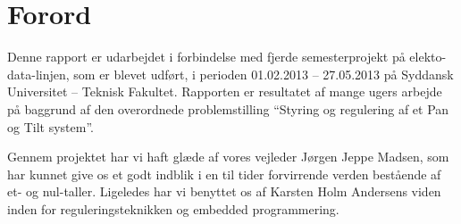 \documentclass[rapport.tex]{subfiles}
\begin{document}
\section*{Forord}

Denne rapport er udarbejdet i forbindelse med fjerde semesterprojekt på elekto-data-linjen, som er blevet udført, i perioden 01.02.2013 – 27.05.2013 på Syddansk Universitet – Teknisk Fakultet. Rapporten er resultatet af mange ugers arbejde på baggrund af den overordnede problemstilling ``Styring og regulering af et Pan og Tilt system''.

Gennem projektet har vi haft glæde af vores vejleder Jørgen Jeppe Madsen, som har kunnet give os et godt indblik i en til tider forvirrende verden bestående af et- og nul-taller. Ligeledes har vi benyttet os af Karsten Holm Andersens viden inden for reguleringsteknikken og embedded programmering.
\end{document}
